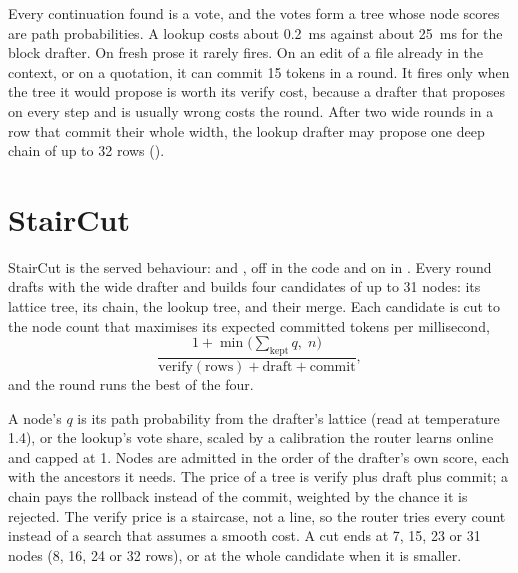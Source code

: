 Every continuation found is a vote, and the votes form a tree whose node scores are path probabilities. A lookup costs about 0.2~ms against about 25~ms for the block drafter. On fresh prose it rarely fires. On an edit of a file already in the context, or on a quotation, it can commit 15 tokens in a round. It fires only when the tree it would propose is worth its verify cost, because a drafter that proposes on every step and is usually wrong costs the round. After two wide rounds in a row that commit their whole width, the lookup drafter may propose one deep chain of up to 32 rows ().

\section{StairCut}

StairCut is the served behaviour:  and , off in the code and on in . Every round drafts with the wide drafter and builds four candidates of up to 31 nodes: its lattice tree, its chain, the lookup tree, and their merge. Each candidate is cut to the node count that maximises its expected committed tokens per millisecond,
\[
\frac{1 + \min\bigl(\sum_{\text{kept}} q,\; n\bigr)}{\text{verify}(\text{rows}) + \text{draft} + \text{commit}},
\]
and the round runs the best of the four.

A node's $q$ is its path probability from the drafter's lattice (read at temperature 1.4), or the lookup's vote share, scaled by a calibration the router learns online and capped at 1. Nodes are admitted in the order of the drafter's own score, each with the ancestors it needs. The price of a tree is verify plus draft plus commit; a chain pays the rollback instead of the commit, weighted by the chance it is rejected. The verify price is a staircase, not a line, so the router tries every count instead of a search that assumes a smooth cost. A cut ends at 7, 15, 23 or 31 nodes (8, 16, 24 or 32 rows), or at the whole candidate when it is smaller.


